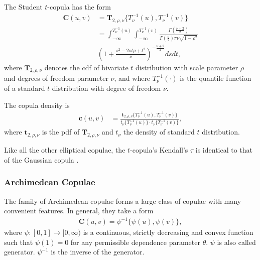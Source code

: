 The Student $t$-copula has the form
\begin{align}
        \bm{C}(u,v) &= \bm{T}_{2, \rho, \nu}\{T^{-1}_\nu(u), T^{-1}_\nu(v)\} \nonumber \\[10pt]
            &= \int_{-\infty}^{T^{-1}_\nu(u)}
               \int_{-\infty}^{T^{-1}_\nu(v)}
            \frac{\Gamma\left(\frac{\nu+2}{2}\right)}
            {\Gamma\left(\frac{\nu}{2}\right)\pi\nu\sqrt{1-\rho^2}}\\[10pt]
           & \left(
        1+\frac{s^2-2st\rho+t^2}{\nu}
        \right)^{-\frac{\nu+2}{2}} ds dt,
    \end{align}
where $\bm{T}_{2, \rho, \nu}$ denotes the cdf of
bivariate $t$ distribution with scale parameter $\rho$  and degrees of freedom parameter $\nu$, 
and where $T^{-1}_\nu(\cdot)$ is the quantile function of a standard
$t$ distribution with degree of freedom $\nu$. 

The copula density is
\begin{align}
    \bm{c}(u,v) &= \frac{\bm{t}_{2, \rho, \nu}\{T^{-1}_\nu(u), T^{-1}_\nu(v)\}}
    {t_\nu\{T^{-1}_\nu(u)\}\cdot t_\nu\{T^{-1}_\nu(v)\}},
    \end{align}
where $\bm{t}_{2,\rho, \nu}$ is the pdf of $\bm{T}_{2, \rho, \nu}$
and $t_\nu$ the density of standard $t$ distribution.\medskip

Like all the other elliptical copulae, the $t$-copula's Kendall's
$\tau$ is identical to that of the Gaussian copula \citep[see][and
references therein]{demarta2005t}. 


\subsubsection{Archimedean Copulae}\label{sec:archimedean-copula}
The family of Archimedean copulae forms a large class of copulae with
many convenient features.
In general, they take a form
\begin{align}
    \bm{C}(u,v)= \psi^{-1}\{\psi(u), \psi(v)\},
    \end{align}
where $\psi:[0,1] \rightarrow [0,\infty)$ is a continuous, strictly
decreasing and convex function such that $\psi(1)=0$ for any
permissible dependence parameter $\theta$. $\psi$ is also called
generator. $\psi^{-1}$ is the inverse of the generator.

